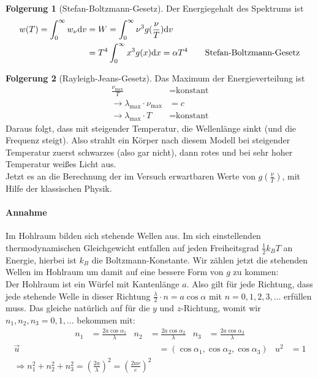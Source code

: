 \documentclass[oneside]{book}
\theoremstyle{definition}
\newtheorem*{folgerung*}{Folgerung}
\renewcommand{\d}{\mathrm d}
\newcommand{\const}{\text{konstant}}
\begin{document}
\begin{folgerung*}[Stefan-Boltzmann-Gesetz]
Der Energiegehalt des Spektrums ist
\begin{align*}
	w(T) =\int_{0}^{\infty} w_\nu \d v &= W = \int_0^\infty \nu^3 g(\frac{\nu}{T}) \d v\\
	&= T^4 \int_0^\infty x^3 g(x) \d x = \alpha T^4 \text{\qquad Stefan-Boltzmann-Gesetz}
\end{align*}
\end{folgerung*}

\begin{folgerung*}[Rayleigh-Jeans-Gesetz]
Das Maximum der Energieverteilung  ist
\begin{align*}
\frac{\nu_\text{max}}{T} &= \const\\
\rightarrow \lambda_\text{max} \cdot \nu_\text{max} &= c\\
\rightarrow \lambda_\text{max} \cdot T &= \const
\end{align*}
Daraus folgt, dass mit steigender Temperatur, die Wellenlänge sinkt (und die Frequenz steigt). Also strahlt ein Körper nach diesem Modell bei steigender Temperatur zuerst schwarzes (also gar nicht), dann rotes und bei sehr hoher Temperatur weißes Licht aus.\\
Jetzt es an die Berechnung der im Versuch erwartbaren Werte von $g(\frac{\nu}{T})$, mit Hilfe der klassischen Physik.
\paragraph{Annahme} Im Hohlraum bilden sich stehende Wellen aus. Im sich einstellenden thermodynamischen Gleichgewicht entfallen auf jeden Freiheitsgrad $\frac12 k_B T$ an Energie, hierbei ist $k_B$ die Boltzmann-Konstante. Wir zählen jetzt die stehenden Wellen im Hohlraum um damit auf eine bessere Form von $g$ zu kommen:\\
Der Hohlraum ist ein Würfel mit Kantenlänge $a$. Also gilt für jede Richtung, dass jede stehende Welle in dieser Richtung $\frac{\lambda}{2}\cdot n = a \cos \alpha$ mit $n = 0, 1, 2, 3, \dots$ erfüllen muss. Das gleiche natürlich auf für die $y$ und $z$-Richtung, womit wir $n_1, n_2, n_3 = 0, 1, \dots$ bekommen mit:
\begin{align*}
n_1 &= \frac{2 a \cos \alpha_1}{\lambda} & n_2 &= \frac{2 a \cos \alpha_2}{\lambda} & n_3 &= \frac{2 a \cos \alpha_3}{\lambda}
\end{align*}
\begin{align*}
\vec{u} &= (\cos \alpha_1, \cos \alpha_2, \cos \alpha_3) & u^2 &= 1\\
\Rightarrow n_1^2 + n_2^2 + n_3^2 = (\frac{2a}{\lambda})^2 = (\frac{2 a \nu}{c})^2
\end{align*}


\end{folgerung*}
\end{document}
